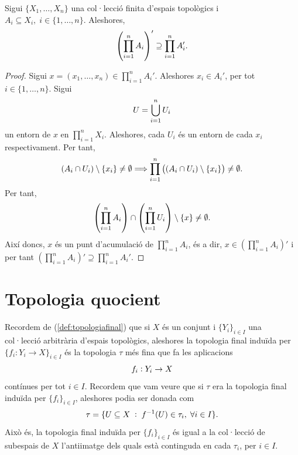 \documentclass[../main.tex]{subfiles}
\begin{document}
\begin{ter}
\label{ter:conjuntpuntsacumulacioespaiproducte} Sigui $\{X_1,\ldots,X_n\}$ una col·lecció finita d'espais topològics i $A_i\subseteq X_i,\;i\in\{1,\ldots,n\}$. Aleshores, 
\begin{equation}
    \notag
    \left(\prod_{i=1}^n A_i\right)'\supseteq \prod_{i=1}^n A_i'.
\end{equation}
\end{ter}
\begin{proof}
Sigui $x = (x_1,\ldots,x_n)\in\prod_{i=1}^n A_i'$. Aleshores $x_i\in A_i'$, per tot $i\in\{1,\ldots,n\}$. Sigui 
\begin{equation}
    \notag
    U = \bigcup_{i=1}^n U_i
\end{equation}
un entorn de $x$ en $\prod_{i=1}^n X_i$. Aleshores, cada $U_i$ és un entorn de cada $x_i$ respectivament. Per tant, 
\begin{equation}
    \notag
    (A_i\cap U_i)\setminus\{x_i\}\not=\emptyset \Longrightarrow \prod_{i=1}^n\left((A_i\cap U_i)\setminus\{x_i\}\right)\not=\emptyset.
\end{equation}
Per tant, 
\begin{equation}
    \notag
    \left(\prod_{i=1}^n A_i\right)\cap \left(\prod_{i=1}^n U_i\right)\setminus\{x\}\not=\emptyset.
\end{equation}
Així doncs, $x$ és un punt d'acumulació de $\prod_{i=1}^n A_i$, és a dir, $x\in\left(\prod_{i=1}^n A_i\right)'$ i per tant $\left(\prod_{i=1}^n A_i\right)'\supseteq\prod_{i=1}^n A_i'$.
\end{proof}


\section{Topologia quocient}
Recordem de (\ref{def:topologiafinal}) que si $X$ és un conjunt i $\{Y_i\}_{i\in I}$ una col·lecció arbitrària d'espais topològics, aleshores la topologia final induïda per $\{f_i:Y_i\rightarrow X\}_{i\in I}$ és la topologia $\tau$ més fina que fa les aplicacions
\begin{equation}
    \notag
    f_i:Y_i\rightarrow X
\end{equation}
contínues per tot $i\in I$. Recordem que vam veure que si $\tau$ era la topologia final induïda per $\{f_i\}_{i\in I}$, aleshores podia ser donada com
\begin{equation}
    \notag
    \tau = \{U\subseteq X\;:\;f^{-1}(U)\in\tau_i,\;\forall i\in I\} .
\end{equation}
Això és, la topologia final induïda per $\{f_i\}_{i\in I}$ és igual a la col·lecció de subespais de $X$ l'antiimatge dels quals està continguda en cada $\tau_i$, per $i\in I$.
\end{document}
